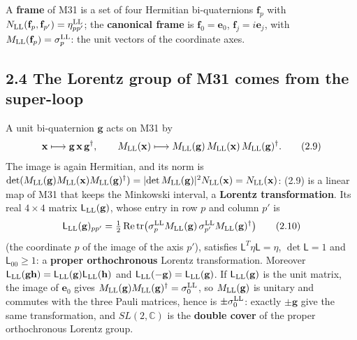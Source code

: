 \documentclass[
  10pt,
]{article}
\begin{document}
A \textbf{frame} of M31 is a set of four Hermitian bi-quaternions
\(\mathbf f_p\) with
\(N_{\rm LL}(\mathbf f_p,\mathbf f_{p'})=\eta^{\rm LL}_{pp'}\); the
\textbf{canonical frame} is \(\mathbf f_0=\mathbf e_0\),
\(\mathbf f_j=i\mathbf e_j\), with
\(M_{\rm LL}(\mathbf f_p)=\sigma^{\rm LL}_p\): the unit vectors of the
coordinate axes.

\hypertarget{the-lorentz-group-of-m31-comes-from-the-super-loop}{%
\subsection{2.4 The Lorentz group of M31 comes from the
super-loop}\label{the-lorentz-group-of-m31-comes-from-the-super-loop}}

A unit bi-quaternion \(\mathbf g\) acts on M31 by
\[\mathbf x\longmapsto\mathbf g\,\mathbf x\,\mathbf g^\dagger,\qquad M_{\rm LL}(\mathbf x)\longmapsto M_{\rm LL}(\mathbf g)\,M_{\rm LL}(\mathbf x)\,M_{\rm LL}(\mathbf g)^\dagger.\tag{2.9}\]
The image is again Hermitian, and its norm is
\(\det(M_{\rm LL}(\mathbf g)M_{\rm LL}(\mathbf x)M_{\rm LL}(\mathbf g)^\dagger)=\lvert\det M_{\rm LL}(\mathbf g)\rvert^2N_{\rm LL}(\mathbf x)=N_{\rm LL}(\mathbf x)\):
(2.9) is a linear map of M31 that keeps the Minkowski interval, a
\textbf{Lorentz transformation}. Its real \(4\times4\) matrix
\(\mathsf L_{\rm LL}(\mathbf g)\), whose entry in row \(p\) and column
\(p'\) is
\[\mathsf L_{\rm LL}(\mathbf g)_{pp'}=\tfrac12\,\mathrm{Re}\,\mathrm{tr}\big(\sigma^{\rm LL}_pM_{\rm LL}(\mathbf g)\,\sigma^{\rm LL}_{p'}M_{\rm LL}(\mathbf g)^\dagger\big)\tag{2.10}\]
(the coordinate \(p\) of the image of the axis \(p'\)), satisfies
\(\mathsf L^T\eta\mathsf L=\eta\), \(\det\mathsf L=1\) and
\(\mathsf L_{00}\ge1\): a \textbf{proper orthochronous} Lorentz
transformation. Moreover
\(\mathsf L_{\rm LL}(\mathbf g\mathbf h)=\mathsf L_{\rm LL}(\mathbf g)\mathsf L_{\rm LL}(\mathbf h)\)
and \(\mathsf L_{\rm LL}(-\mathbf g)=\mathsf L_{\rm LL}(\mathbf g)\). If
\(\mathsf L_{\rm LL}(\mathbf g)\) is the unit matrix, the image of
\(\mathbf e_0\) gives
\(M_{\rm LL}(\mathbf g)M_{\rm LL}(\mathbf g)^\dagger=\sigma^{\rm LL}_0\),
so \(M_{\rm LL}(\mathbf g)\) is unitary and commutes with the three
Pauli matrices, hence is \(\pm\sigma^{\rm LL}_0\): exactly
\(\pm\mathbf g\) give the same transformation, and \(SL(2,\mathbb C)\)
is the \textbf{double cover} of the proper orthochronous Lorentz group.
\end{document}
